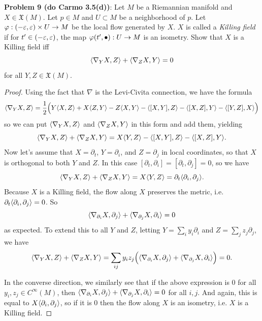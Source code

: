 \documentclass{amsart}
\renewcommand{\X}{\mathfrak{X}}
\begin{document}
	\textbf{Problem 9 (do Carmo 3.5(d))}: Let $M$ be a Riemannian manifold and $X\in \X(M)$. Let $p\in M$ and $U\subset M$ be a neighborhood of $p$. Let $\varphi:(-\varepsilon,\varepsilon)\times U\to M$ be the local flow generated by $X$. $X$ is called a \textit{Killing field} if for $t'\in (-\varepsilon,\varepsilon)$, the map $\varphi(t',\bullet):U\to M$ is an isometry. Show that $X$ is a Killing field iff 
	$$
	\langle\nabla_YX, Z\rangle + \langle\nabla_Z X,Y\rangle=0
	$$
	for all $Y,Z\in \X(M)$.
	\begin{proof}
		Using the fact that $\nabla$ is the Levi-Civita connection, we have the formula
		$$
		\langle\nabla_YX,Z\rangle = \frac12 \Big(Y\langle X,Z\rangle + X\langle Z,Y\rangle - Z\langle X,Y\rangle - \langle[X,Y],Z\rangle - \langle[X,Z],Y\rangle - \langle[Y,Z],X\rangle\Big)
		$$
		so we can put $\langle\nabla_Y X,Z\rangle$ and $\langle\nabla_Z X,Y\rangle$ in this form and add them, yielding
		$$
		\langle\nabla_Y X,Z\rangle + \langle\nabla_Z X,Y\rangle = X\langle Y,Z\rangle - \langle[X,Y],Z\rangle - \langle[X,Z],Y\rangle.
		$$
		Now let's assume that $X=\partial_t$, $Y=\partial_i$, and $Z=\partial_j$ in local coordinates, so that $X$ is orthogonal to both $Y$ and $Z$. In this case $[\partial_t,\partial_i]=[\partial_t,\partial_j]=0$, so we have
		$$
		\langle\nabla_Y X,Z\rangle + \langle\nabla_Z X, Y\rangle = X\langle Y,Z\rangle = \partial_t \langle\partial_i,\partial_j\rangle.
		$$
		Because $X$ is a Killing field, the flow along $X$ preserves the metric, i.e. $\partial_t \langle\partial_i,\partial_j\rangle=0$. So
		$$
		\langle\nabla_{\partial_i} X,\partial_j \rangle + \langle\nabla_{\partial_j} X, \partial_i\rangle = 0 
		$$
		as expected. To extend this to all $Y$ and $Z$, letting $Y = \sum_i y_i \partial_i$ and $Z=\sum_j z_j\partial_j$, we have
		$$
		\langle\nabla_Y X,Z\rangle + \langle\nabla_ZX,Y\rangle = \sum_{ij} y_iz_j\Big(\langle\nabla_{\partial_i} X, \partial_j\rangle + \langle\nabla_{\partial_j} X, \partial_i\rangle \Big) = 0.
		$$
		
		In the converse direction, we similarly see that if the above expression is 0 for all $y_i,z_j\in C^{\infty}(M)$, then $\langle\nabla_{\partial_i} X,\partial_j\rangle + \langle\nabla_{\partial_j} X,\partial_i\rangle=0$ for all $i,j$. And again, this is equal to $X\langle\partial_i,\partial_j\rangle$, so if it is 0 then the flow along $X$ is an isometry, i.e. $X$ is a Killing field.
	\end{proof}\\
	
\end{document}
